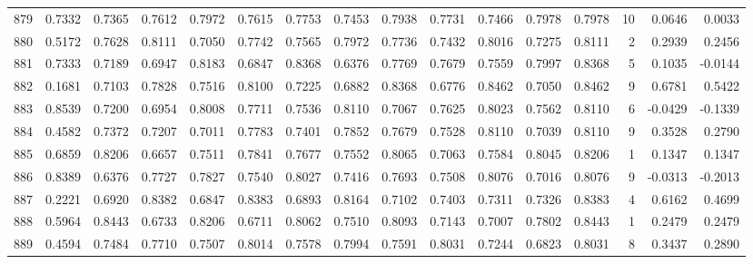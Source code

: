 \begin{tabular}{lrrrrrrrrrrrrrrr}
879 &      0.7332 &  0.7365 &  0.7612 &  0.7972 &  0.7615 &  0.7753 &  0.7453 &  0.7938 &  0.7731 &  0.7466 &   0.7978 &     0.7978 &     10 &                    0.0646 &                     0.0033 \\
880 &      0.5172 &  0.7628 &  0.8111 &  0.7050 &  0.7742 &  0.7565 &  0.7972 &  0.7736 &  0.7432 &  0.8016 &   0.7275 &     0.8111 &      2 &                    0.2939 &                     0.2456 \\
881 &      0.7333 &  0.7189 &  0.6947 &  0.8183 &  0.6847 &  0.8368 &  0.6376 &  0.7769 &  0.7679 &  0.7559 &   0.7997 &     0.8368 &      5 &                    0.1035 &                    -0.0144 \\
882 &      0.1681 &  0.7103 &  0.7828 &  0.7516 &  0.8100 &  0.7225 &  0.6882 &  0.8368 &  0.6776 &  0.8462 &   0.7050 &     0.8462 &      9 &                    0.6781 &                     0.5422 \\
883 &      0.8539 &  0.7200 &  0.6954 &  0.8008 &  0.7711 &  0.7536 &  0.8110 &  0.7067 &  0.7625 &  0.8023 &   0.7562 &     0.8110 &      6 &                   -0.0429 &                    -0.1339 \\
884 &      0.4582 &  0.7372 &  0.7207 &  0.7011 &  0.7783 &  0.7401 &  0.7852 &  0.7679 &  0.7528 &  0.8110 &   0.7039 &     0.8110 &      9 &                    0.3528 &                     0.2790 \\
885 &      0.6859 &  0.8206 &  0.6657 &  0.7511 &  0.7841 &  0.7677 &  0.7552 &  0.8065 &  0.7063 &  0.7584 &   0.8045 &     0.8206 &      1 &                    0.1347 &                     0.1347 \\
886 &      0.8389 &  0.6376 &  0.7727 &  0.7827 &  0.7540 &  0.8027 &  0.7416 &  0.7693 &  0.7508 &  0.8076 &   0.7016 &     0.8076 &      9 &                   -0.0313 &                    -0.2013 \\
887 &      0.2221 &  0.6920 &  0.8382 &  0.6847 &  0.8383 &  0.6893 &  0.8164 &  0.7102 &  0.7403 &  0.7311 &   0.7326 &     0.8383 &      4 &                    0.6162 &                     0.4699 \\
888 &      0.5964 &  0.8443 &  0.6733 &  0.8206 &  0.6711 &  0.8062 &  0.7510 &  0.8093 &  0.7143 &  0.7007 &   0.7802 &     0.8443 &      1 &                    0.2479 &                     0.2479 \\
889 &      0.4594 &  0.7484 &  0.7710 &  0.7507 &  0.8014 &  0.7578 &  0.7994 &  0.7591 &  0.8031 &  0.7244 &   0.6823 &     0.8031 &      8 &                    0.3437 &                     0.2890 \\

\end{tabular}
